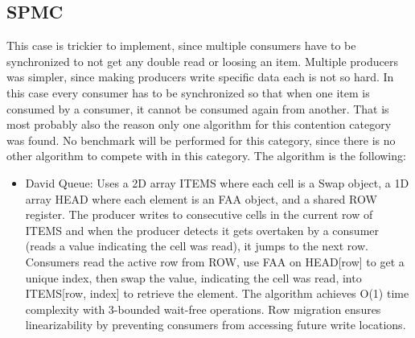 \subsection{\acf{SPMC}}\label{subsec:single-producer-and-multiple-consumer}
This case is trickier to implement, since multiple consumers have to be synchronized to not get any double read or loosing an item. Multiple producers was simpler, since making producers write specific data each is not so hard. In this case every consumer has to be synchronized so that when one item is consumed by a consumer, it cannot be consumed again from another. That is most probably also the reason only one algorithm for this contention category was found. No benchmark will be performed for this category, since there is no other algorithm to compete with in this category. The algorithm is the following:
\begin{itemize}
   \item David Queue: Uses a 2D array ITEMS where each cell is a Swap object, a 1D array HEAD where each element is an \ac{FAA} object, and a shared ROW register. The producer writes to consecutive cells in the current row of ITEMS and when the producer detects it gets overtaken by a consumer (reads a value indicating the cell was read), it jumps to the next row. Consumers read the active row from ROW, use \ac{FAA} on HEAD[row] to get a unique index, then swap the value, indicating the cell was read, into ITEMS[row, index] to retrieve the element. The algorithm achieves O(1) time complexity with 3-bounded wait-free operations. Row migration ensures linearizability by preventing consumers from accessing future write locations. \cite{Mateíspmc}
\end{itemize}

